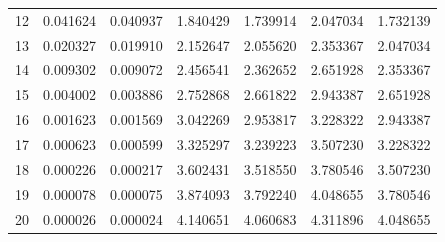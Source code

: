 \documentclass[14pt, a4paper]{article}  %
\begin{document}
\begin{table}[!ht]
\begin{tabular}{lrrrrrr}
    12 & 0.041624 & 0.040937 & 1.840429 & 1.739914 & 2.047034 & 1.732139 \\
    13 & 0.020327 & 0.019910 & 2.152647 & 2.055620 & 2.353367 & 2.047034 \\
    14 & 0.009302 & 0.009072 & 2.456541 & 2.362652 & 2.651928 & 2.353367 \\
    15 & 0.004002 & 0.003886 & 2.752868 & 2.661822 & 2.943387 & 2.651928 \\
    16 & 0.001623 & 0.001569 & 3.042269 & 2.953817 & 3.228322 & 2.943387 \\
    17 & 0.000623 & 0.000599 & 3.325297 & 3.239223 & 3.507230 & 3.228322 \\
    18 & 0.000226 & 0.000217 & 3.602431 & 3.518550 & 3.780546 & 3.507230 \\
    19 & 0.000078 & 0.000075 & 3.874093 & 3.792240 & 4.048655 & 3.780546 \\
    20 & 0.000026 & 0.000024 & 4.140651 & 4.060683 & 4.311896 & 4.048655 \\
    \bottomrule
    \end{tabular}
\end{table}
\end{document}
